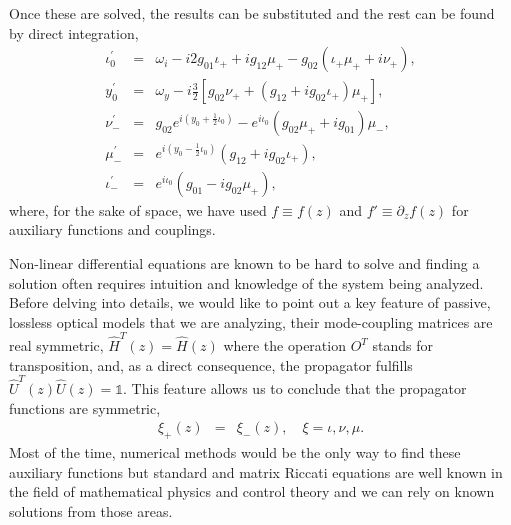\documentclass[9pt,twocolumn,twoside]{osajnl}
\begin{document}
Once these are solved, the results can be substituted and the rest can be found by direct integration,
\begin{eqnarray}
\iota_{0}^{\prime} &=& \omega_{i} - i 2  g_{01} \iota_{+} + i g_{12} \mu_{+} - g_{02} \left( \iota_{+} \mu_{+} + i \nu_{+} \right) ,\label{eq:diff1} \\
y_{0}^{\prime} &=& \omega_{y} - i\frac{3}{2}  
[ g_{02}   \nu_{+} +    
( g_{12} + i  g_{02} \iota_{+})\mu_{+}], \label{eq:diff2} \\
\nu_{-}^{\prime} &=& g_{02} e^{i  \left( y_0 + \frac{1}{2} \iota_0 \right)}
-  e^{i\iota_{0}}   \left( g_{02} \mu_{+} + i  g_{01} \right) \mu_{-} , \label{eq:mu:min} \\
\mu_{-}^{\prime} &=&  e^{i  \left( y_0 - \frac{1}{2} \iota_0 \right)}
( g_{12} + i g_{02} \iota_{+}),\\
\iota_{-}^{\prime} &=& e^{i \iota_{0}} \left( g_{01} - i g_{02}\mu_{+} \right),\label{eq:iota:min}
\end{eqnarray}
where, for the sake of space, we have used $f \equiv f(z)$ and $f' \equiv \partial_{z} f(z)$ for auxiliary functions and couplings.

Non-linear differential equations are known to be hard to solve and finding a solution 
often requires intuition and knowledge of the system being analyzed. 
Before delving into details, we would like to point out a key feature of passive, lossless optical models that we are analyzing, their mode-coupling matrices are real symmetric, $\hat{H}^{T}(z) = \hat{H}(z)$ where the operation $O^{T}$ stands for transposition,  and, as a direct consequence, the propagator fulfills $\hat{U}^{T}(z) \hat{U}(z) = \mathbb{1}$.
This feature allows us to conclude that the propagator functions are symmetric,
\begin{eqnarray}\label{eq:symmCon}
	\xi_{+}(z)&=&\xi_{-}(z), \quad \xi = \iota, \nu, \mu.
\end{eqnarray}
Most of the time, numerical methods would be the only way to find these auxiliary functions but standard and matrix Riccati equations are well known in the field of mathematical physics and control theory and we can rely on known solutions from those areas.
\end{document}
